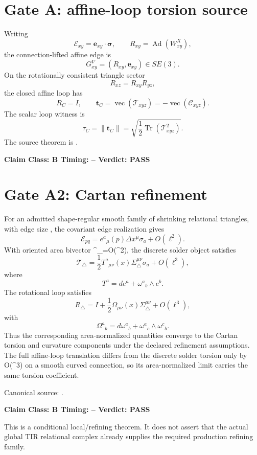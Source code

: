 \documentclass[11pt,a4paper,twoside]{book}
\def\({}%
\def\){}%
\theoremstyle{definition}
\newcommand{\vTwelveStatus}[3]{\par\noindent\textbf{Claim Class: #1 \quad Timing: #2 \quad Verdict: #3}\par}
\begin{document}
\section{Gate A: affine-loop torsion source}

Writing
\[
\mathcal E_{xy}=\mathbf e_{xy}\cdot\boldsymbol\sigma,
\qquad
R_{xy}=\operatorname{Ad}(W_{xy}^{X}),
\]
the connection-lifted affine edge is
\[
\boxed{G_{xy}^{\nabla}=(R_{xy},\mathbf e_{xy})\in SE(3)}.
\]
On the rotationally consistent triangle sector
\[
R_{xz}=R_{xy}R_{yz},
\]
the closed affine loop has
\[
\boxed{R_C=I},
\qquad
\boxed{
\mathbf t_C
=\operatorname{vec}(\mathcal T_{xyz})
=-\operatorname{vec}(\mathcal C_{xyz}).
}
\]
The scalar loop witness is
\[
\boxed{
\tau_C
=\|\mathbf t_C\|
=\sqrt{\frac12\operatorname{Tr}(\mathcal T_{xyz}^2)}.
}
\]
The source theorem is
.
\vTwelveStatus{B}{--}{PASS}

\section{Gate A2: Cartan refinement}

For an admitted shape-regular smooth family of shrinking relational triangles,
with edge size \(\ell{}\), the covariant edge realization gives
\[
\mathcal E_{pq}
=e^a{}_{\mu}(p)\Delta x^{\mu}\sigma_a+O(\ell^2).
\]
With oriented area bivector \(\Sigma^{\mu\nu}_{\triangle}=O(\ell^2)\),
the discrete solder object satisfies
\[
\boxed{
\mathcal T_{\triangle}
=\frac12T^a{}_{\mu\nu}(x)
\Sigma^{\mu\nu}_{\triangle}\sigma_a
+O(\ell^3),
}
\]
where
\[
\boxed{T^a=de^a+\omega^a{}_b\wedge e^b}.
\]
The rotational loop satisfies
\[
\boxed{
R_{\triangle}
=I+\frac12\Omega_{\mu\nu}(x)
\Sigma^{\mu\nu}_{\triangle}+O(\ell^3),
}
\]
with
\[
\boxed{
\Omega^a{}_b
=d\omega^a{}_b+\omega^a{}_c\wedge\omega^c{}_b.
}
\]
Thus the corresponding area-normalized quantities converge to the Cartan
torsion and curvature components under the declared refinement assumptions.
The full affine-loop translation differs from the discrete solder torsion only
by \(O(\ell^3)\) on a smooth curved connection, so its area-normalized limit
carries the same torsion coefficient.

Canonical source:
.
\vTwelveStatus{B}{--}{PASS}

This is a conditional local/refining theorem.  It does not assert that the
actual global TIR relational complex already supplies the required production
refining family.
\end{document}
